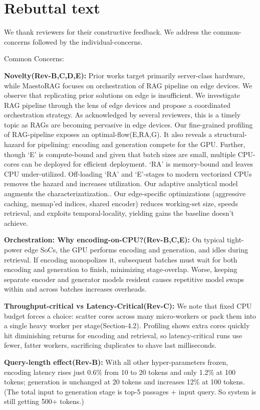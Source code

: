 \section*{Rebuttal text}
We thank reviewers for their constructive feedback. We address the common-concerns followed by the individual-concerns. 

Common Concerns:

\textbf{Novelty(Rev-B,C,D,E):}
Prior works target primarily server-class hardware, while MaestoRAG focuses on orchestration of RAG pipeline on edge devices. We observe that replicating prior solutions on edge is insufficient. 
We investigate RAG pipeline through the lens of edge devices and propose a coordinated orchestration strategy. As acknowledged by several reviewers, this is  a timely topic as RAGs are becoming pervasive in edge devices.  
Our fine-grained profiling of RAG-pipeline exposes an optimal-flow(E,RA,G). It also reveals a structural-hazard for pipelining: encoding and generation compete for the GPU. Further, though ‘E’ is compute-bound and given that batch sizes are small, multiple CPU-cores can be deployed for efficient deployment. ‘RA’ is memory-bound and leaves CPU under-utilized. Off-loading ‘RA’ and ‘E’-stages to modern vectorized CPUs removes the hazard and increases utilization. Our adaptive analytical model augments the characterizatization..
Our edge-specific optimizations (aggressive caching, memap’ed indices, shared encoder) reduces working-set size, speeds retrieval, and exploits temporal-locality, yielding gains the baseline doesn’t achieve.

\textbf{Orchestration:
Why encoding-on-CPU?(Rev-B,C,E):} On typical tight-power edge SoCs, the GPU performs encoding and generation, and idles during retrieval. If encoding monopolizes it, subsequent batches must wait for both encoding and generation to finish, minimizing stage-overlap. Worse, keeping separate encoder and generator models resident causes repetitive model swaps within and across batches increases overheads.

\textbf{Throughput-critical vs Latency-Critical(Rev-C):} We note that fixed CPU budget forces a choice: scatter cores across many micro-workers or pack them into a single heavy worker per stage(Section-4.2). Profiling shows extra cores quickly hit diminishing returns for encoding and retrieval, so latency-critical runs use fewer, fatter workers, sacrificing duplicates to shave last milliseconds. 

\textbf{Query-length effect(Rev-B):} With all other hyper-parameters frozen, encoding latency rises just 0.6\% from 10 to 20 tokens and only 1.2\% at 100 tokens; generation is unchanged at 20 tokens and increases 12\% at 100 tokens. (The total input to generation stage is top-5 passages + input query. So system is still getting 500+ tokens.)

